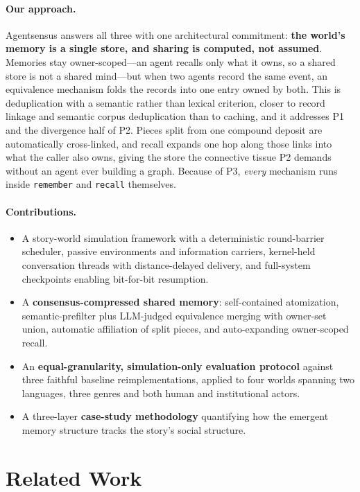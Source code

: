 \documentclass{article}
\newcommand{\code}[1]{\texttt{\small #1}}
\begin{document}
\paragraph{Our approach.} Agentsensus answers all three with one architectural
commitment: \textbf{the world's memory is a single store, and sharing is
computed, not assumed}. Memories stay owner-scoped---an agent recalls only what
it owns, so a shared store is not a shared mind---but when two agents record the
same event, an equivalence mechanism folds the records into one entry owned by
both. This is deduplication with a semantic rather than lexical criterion,
closer to record linkage \citep{fellegi1969record} and semantic corpus
deduplication \citep{abbas2023semdedup} than to caching, and it addresses P1 and
the divergence half of P2. Pieces split from one compound deposit are
automatically cross-linked, and recall expands one hop along those links into
what the caller also owns, giving the store the connective tissue P2 demands
without an agent ever building a graph. Because of P3, \emph{every} mechanism
runs inside \code{remember} and \code{recall} themselves.

\paragraph{Contributions.}
\begin{itemize}
\item A story-world simulation framework with a deterministic round-barrier
  scheduler, passive environments and information carriers, kernel-held
  conversation threads with distance-delayed delivery, and full-system
  checkpoints enabling bit-for-bit resumption.
\item A \textbf{consensus-compressed shared memory}: self-contained atomization,
  semantic-prefilter plus LLM-judged equivalence merging with owner-set union,
  automatic affiliation of split pieces, and auto-expanding owner-scoped recall.
\item An \textbf{equal-granularity, simulation-only evaluation protocol} against
  three faithful baseline reimplementations, applied to four worlds spanning two
  languages, three genres and both human and institutional actors.
\item A three-layer \textbf{case-study methodology} quantifying how the emergent
  memory structure tracks the story's social structure.

\end{itemize}

\section{Related Work}
\end{document}
